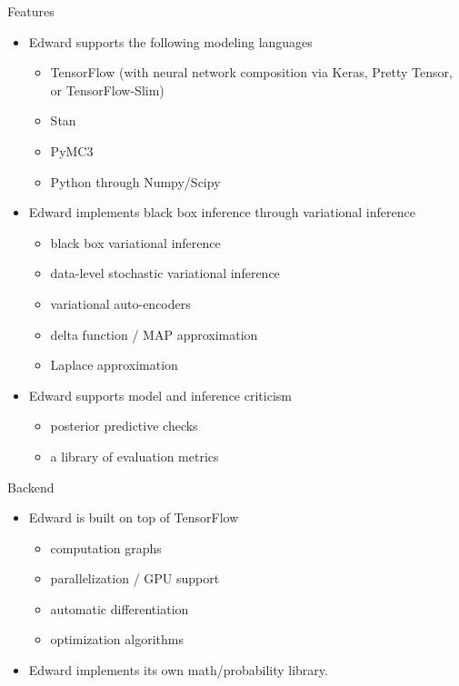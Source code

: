 \documentclass{beamer}
\begin{document}
\begin{frame}[t]
\begin{columns}[t,totalwidth=10in]
\begin{column}{\onecolwid}
\begin{block}{Features}
\begin{itemize}
  \item Edward supports the following modeling languages\newline
  \begin{itemize}
    \item TensorFlow (with neural network composition via Keras, Pretty
    Tensor, or TensorFlow-Slim)
    \item Stan
    \item PyMC3
    \item Python through Numpy/Scipy\newline
  \end{itemize}
  \item Edward implements black box inference through variational inference
  \newline
  \begin{itemize}
    \item black box variational inference \citep{ranganath2014black}
    \item data-level stochastic variational inference \citep{hoffman2013stochastic}
    \item variational auto-encoders \citep{kingma2013auto}
    \item delta function / MAP approximation
    \item Laplace approximation\newline
  \end{itemize}
  \item Edward supports model and inference criticism\newline
  \begin{itemize}
    \item posterior predictive checks \citep{gelman1996posterior}
    \item a library of evaluation metrics
  \end{itemize}
\end{itemize}
\end{block}

\begin{block}{Backend}
\begin{itemize}
  \item Edward is built on top of TensorFlow\newline
  \begin{itemize}
    \item computation graphs
    \item parallelization / GPU support
    \item automatic differentiation
    \item optimization algorithms\newline
  \end{itemize}
  \item Edward implements its own math/probability library.
\end{itemize}
\end{block}


\end{column}
\end{columns}
\end{frame}
\end{document}
